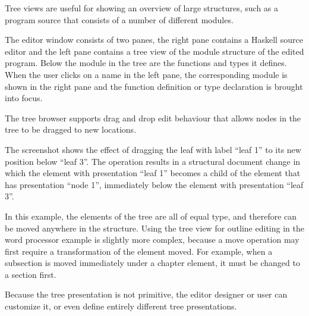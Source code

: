 
Tree views are useful for showing an overview of large structures, such as a program source that consists of a number of different modules. 


The editor window consists of two panes, the right pane contains a Haskell source editor and the left pane contains a tree view of the module structure of the edited program. Below the module in the tree are the functions and types it defines. When the user clicks on a name in the left pane, the corresponding module is shown in the right pane and the function definition or type declaration is brought into focus. 


The tree browser supports drag and drop edit behaviour that allows nodes in the tree to be dragged to new locations. 


The screenshot shows the effect of dragging the leaf with label ``leaf 1'' to its new position below ``leaf 3''. The operation results in a structural document change in which the element with presentation ``leaf 1'' becomes a child of the element that has presentation ``node 1'', immediately below the element with presentation ``leaf 3''.

In this example, the elements of the tree are all of equal type, and therefore can be moved anywhere in the structure. %
Using the tree view for outline editing in the word processor example is slightly more complex, because a move operation may first require a transformation of the element moved. For example, when a subsection is moved immediately under a chapter element, it must be changed to a section first. 


Because the tree presentation is not primitive, the editor designer or user can customize it, or even define entirely different tree presentations.


